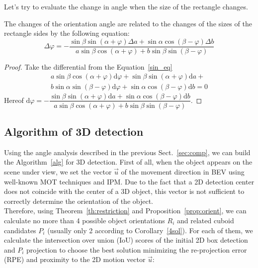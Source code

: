 \documentclass[graybox]{svmult}
\begin{document}
Let's try to evaluate the change in angle when the size of the rectangle changes.
\begin{corollary}
The changes of the orientation angle are related to the changes of the sizes of the rectangle sides by the following equation:
\begin{equation}
    \Delta \varphi = - \frac{\sin \beta \sin{(\alpha + \varphi)} \Delta a + \sin \alpha \cos{(\beta - \varphi)} \Delta b}{a \sin \beta \cos{(\alpha + \varphi)} + b \sin \beta \sin{(\beta - \varphi)}}
\end{equation}
\end{corollary}
\begin{proof}
Take the differential from the Equation~\ref{sin_eq}
\begin{multline*}
a \sin \beta \cos{(\alpha + \varphi)} \mathrm{d}\varphi + \sin \beta \sin{(\alpha + \varphi)} \mathrm{d}a + \\
b \sin \alpha \sin{(\beta - \varphi)} \mathrm{d} \varphi + \sin \alpha \cos{(\beta - \varphi)} \mathrm{d}b = 0
\end{multline*}
Hereof
$    \mathrm{d} \varphi = -\dfrac{\sin \beta \sin{(\alpha + \varphi)} \mathrm{d} a + \sin \alpha \cos{(\beta - \varphi)}\mathrm{d} b}{a \sin \beta \cos{(\alpha + \varphi)} + b \sin \beta \sin{(\beta - \varphi)}}$.
\end{proof}

\subsection{Algorithm of 3D detection}

Using the angle analysis described in the previous Sect.~\ref{sec:comp}, we can build the Algorithm~\ref{alg} for 3D detection. 
First of all, when the object appears on the scene under view, we set the vector $\vec{u}$ of the movement direction in BEV using well-known MOT techniques \cite{kalman_mot} and IPM.
Due to the fact that a 2D detection center does not coincide with the center of a 3D object, this vector is not sufficient to correctly determine the orientation of the object.\\

Therefore, using Theorem~\ref{th:restriction} and Proposition~\ref{prop:orient}, we can calculate no more than 4 possible object orientations $R_i $ and related cuboid candidates $P_i$ (usually only 2 according to Corollary~\ref{4sol}).
For each of them, we calculate the  intersection over union (IoU) scores of the initial 2D box detection and $P_i$ projection to choose the best solution minimizing the re-projection error (RPE) and proximity to the 2D motion vector $\vec{u}$:
\end{document}
